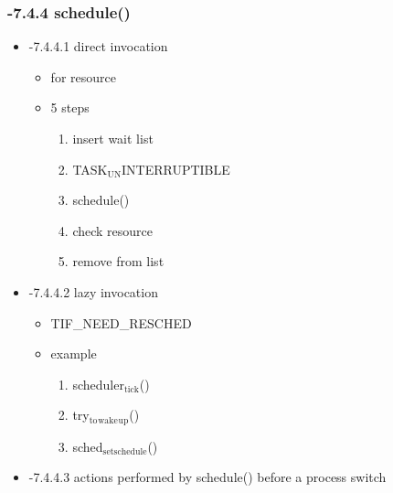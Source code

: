 \documentclass[11pt]{article}
\begin{document}
\subsubsection{-7.4.4 schedule()}
\label{sec-2.4.4}


\begin{itemize}

\item -7.4.4.1 direct invocation\\
\label{sec-2.4.4.1}

\begin{itemize}
\item for resource
\item 5 steps

\begin{enumerate}
\item insert wait list
\item TASK$_{\mathrm{UN}}$INTERRUPTIBLE
\item schedule()
\item check resource
\item remove from list
\end{enumerate}

\end{itemize}

\item -7.4.4.2 lazy invocation\\
\label{sec-2.4.4.2}

\begin{itemize}
\item TIF\_NEED\_RESCHED
\item example

\begin{enumerate}
\item scheduler$_{\mathrm{tick}}$()
\item try$_{\mathrm{to}}$$_{\mathrm{wake}}$$_{\mathrm{up}}$()
\item sched$_{\mathrm{setschedule}}$()
\end{enumerate}

\end{itemize}

\item -7.4.4.3 actions performed by schedule() before a process switch\\
\label{sec-2.4.4.3}


\end{itemize}
\end{document}
